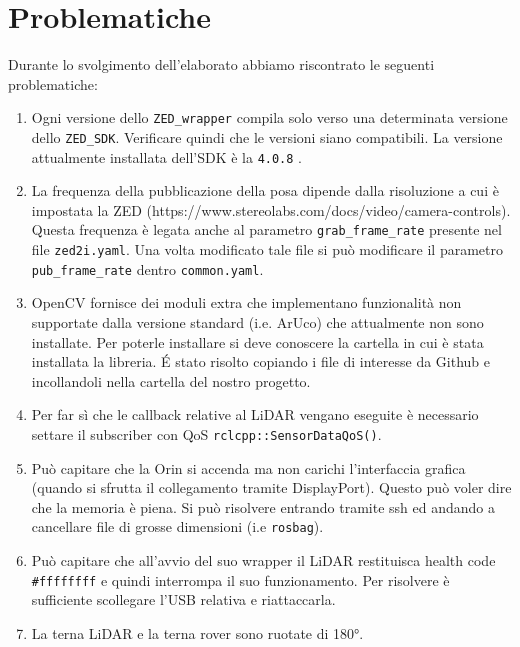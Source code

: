 \documentclass{article}
\begin{document}
\section*{Problematiche}
Durante lo svolgimento dell'elaborato abbiamo riscontrato le seguenti problematiche:
\begin{enumerate} 
  \item Ogni versione dello \texttt{ZED\_wrapper} compila solo verso una determinata versione dello \texttt{ZED\_SDK}. Verificare quindi che le versioni siano compatibili. La versione attualmente installata dell'SDK è la \texttt{4.0.8} .
  \item La frequenza della pubblicazione della posa dipende dalla risoluzione a cui è impostata la ZED (https://www.stereolabs.com/docs/video/camera-controls). Questa frequenza è legata anche al parametro \texttt{grab\_frame\_rate} presente nel file \texttt{zed2i.yaml}. Una volta modificato tale file si può modificare il parametro \texttt{pub\_frame\_rate} dentro \texttt{common.yaml}.  
  \item  OpenCV fornisce dei moduli extra che implementano funzionalità non supportate dalla versione standard (i.e. ArUco) che attualmente non sono installate. Per poterle installare si deve conoscere la cartella in cui è stata installata la libreria. \'E stato risolto copiando i file di interesse da Github e incollandoli nella cartella del nostro progetto.
  \item Per far sì che le callback relative al LiDAR vengano eseguite è necessario settare il subscriber con QoS \texttt{rclcpp::SensorDataQoS()}. 
   \item Può capitare che la Orin si accenda ma non carichi l'interfaccia grafica (quando si sfrutta il collegamento tramite DisplayPort). Questo può voler dire che la memoria è piena. Si può risolvere entrando tramite ssh ed andando a cancellare file di grosse dimensioni (i.e \texttt{rosbag}). 
   \item Può capitare che all'avvio del suo wrapper il LiDAR restituisca health code \texttt{\#ffffffff} e quindi interrompa il suo funzionamento. Per risolvere è sufficiente scollegare l'USB relativa e riattaccarla. 
   \item La terna LiDAR e la terna rover sono ruotate di 180°.
\end{enumerate}

\newpage
{}
\nocite{*}


\end{document}
